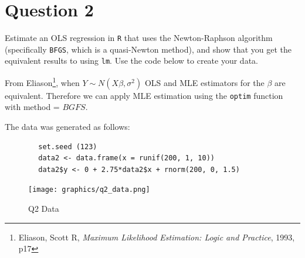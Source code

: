 \documentclass[12pt,letterpaper]{article}
\begin{document}
%  
	\clearpage


\section*{Question 2}
\noindent Estimate an OLS regression in \texttt{R} that uses the Newton-Raphson algorithm (specifically \texttt{BFGS}, which is a quasi-Newton method), and show that you get the equivalent results to using \texttt{lm}. Use the code below to create your data.

From Eliason\footnote{Eliason, Scott R, \emph{Maximum Likelihood Estimation: Logic and Practice}, 1993, p17}, when $Y \sim N(X\beta, \sigma^2)$  OLS and MLE estimators for the $\beta$ are equivalent.  Therefore we can apply MLE estimation using the \texttt{optim} function with method = $BGFS$.

	The data was generated as follows:

	\begin{lstlisting}
		set.seed (123)
		data2 <- data.frame(x = runif(200, 1, 10))
		data2$y <- 0 + 2.75*data2$x + rnorm(200, 0, 1.5)

	\end{lstlisting}

  \begin{figure}[!htbp]
	  \texttt{[image: graphics/q2\_data.png]}
	  \caption{Q2 Data}
	  \label{fig:mle:data}
	\end{figure}

\end{document}
